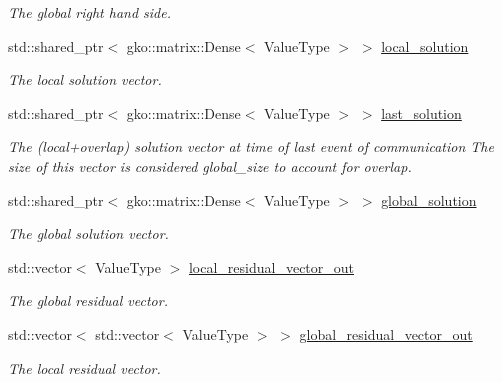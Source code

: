 \begin{DoxyCompactItemize}
\begin{DoxyCompactList}\small\item\em The global right hand side. \end{DoxyCompactList}\item 
\mbox{\label{classschwz_1_1SchwarzBase_a29ef68da307b6de9b8ae878df8fb19d4}} 
std\+::shared\+\_\+ptr$<$ gko\+::matrix\+::\+Dense$<$ Value\+Type $>$ $>$ \hyperlink{classschwz_1_1SchwarzBase_a29ef68da307b6de9b8ae878df8fb19d4}{local\+\_\+solution}
\begin{DoxyCompactList}\small\item\em The local solution vector. \end{DoxyCompactList}\item 
\mbox{\label{classschwz_1_1SchwarzBase_a937e97d9de072f3058b57806b4b88b11}} 
std\+::shared\+\_\+ptr$<$ gko\+::matrix\+::\+Dense$<$ Value\+Type $>$ $>$ \hyperlink{classschwz_1_1SchwarzBase_a937e97d9de072f3058b57806b4b88b11}{last\+\_\+solution}
\begin{DoxyCompactList}\small\item\em The (local+overlap) solution vector at time of last event of communication The size of this vector is considered global\+\_\+size to account for overlap. \end{DoxyCompactList}\item 
\mbox{\label{classschwz_1_1SchwarzBase_a8e6f088b8a7112af2ce27285d8d91bcc}} 
std\+::shared\+\_\+ptr$<$ gko\+::matrix\+::\+Dense$<$ Value\+Type $>$ $>$ \hyperlink{classschwz_1_1SchwarzBase_a8e6f088b8a7112af2ce27285d8d91bcc}{global\+\_\+solution}
\begin{DoxyCompactList}\small\item\em The global solution vector. \end{DoxyCompactList}\item 
\mbox{\label{classschwz_1_1SchwarzBase_a1ecd383f150abee6b3076338ecc5e783}} 
std\+::vector$<$ Value\+Type $>$ \hyperlink{classschwz_1_1SchwarzBase_a1ecd383f150abee6b3076338ecc5e783}{local\+\_\+residual\+\_\+vector\+\_\+out}
\begin{DoxyCompactList}\small\item\em The global residual vector. \end{DoxyCompactList}\item 
\mbox{\label{classschwz_1_1SchwarzBase_ae060fc8510ce947d893204693755dd97}} 
std\+::vector$<$ std\+::vector$<$ Value\+Type $>$ $>$ \hyperlink{classschwz_1_1SchwarzBase_ae060fc8510ce947d893204693755dd97}{global\+\_\+residual\+\_\+vector\+\_\+out}
\begin{DoxyCompactList}\small\item\em The local residual vector. \end{DoxyCompactList}\end{DoxyCompactItemize}
